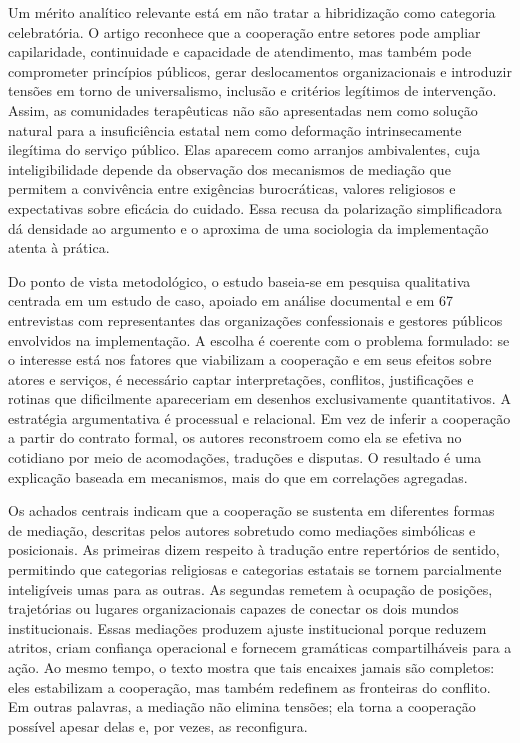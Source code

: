 \documentclass[12pt,a4paper]{article}
\begin{document}
Um mérito analítico relevante está em não tratar a hibridização como categoria celebratória. O artigo reconhece que a cooperação entre setores pode ampliar capilaridade, continuidade e capacidade de atendimento, mas também pode comprometer princípios públicos, gerar deslocamentos organizacionais e introduzir tensões em torno de universalismo, inclusão e critérios legítimos de intervenção. Assim, as comunidades terapêuticas não são apresentadas nem como solução natural para a insuficiência estatal nem como deformação intrinsecamente ilegítima do serviço público. Elas aparecem como arranjos ambivalentes, cuja inteligibilidade depende da observação dos mecanismos de mediação que permitem a convivência entre exigências burocráticas, valores religiosos e expectativas sobre eficácia do cuidado. Essa recusa da polarização simplificadora dá densidade ao argumento e o aproxima de uma sociologia da implementação atenta à prática.\parencite{lotta2023_jesus_speaks}

Do ponto de vista metodológico, o estudo baseia-se em pesquisa qualitativa centrada em um estudo de caso, apoiado em análise documental e em 67 entrevistas com representantes das organizações confessionais e gestores públicos envolvidos na implementação. A escolha é coerente com o problema formulado: se o interesse está nos fatores que viabilizam a cooperação e em seus efeitos sobre atores e serviços, é necessário captar interpretações, conflitos, justificações e rotinas que dificilmente apareceriam em desenhos exclusivamente quantitativos. A estratégia argumentativa é processual e relacional. Em vez de inferir a cooperação a partir do contrato formal, os autores reconstroem como ela se efetiva no cotidiano por meio de acomodações, traduções e disputas. O resultado é uma explicação baseada em mecanismos, mais do que em correlações agregadas.\parencite{lotta2023_jesus_speaks}

Os achados centrais indicam que a cooperação se sustenta em diferentes formas de mediação, descritas pelos autores sobretudo como mediações simbólicas e posicionais. As primeiras dizem respeito à tradução entre repertórios de sentido, permitindo que categorias religiosas e categorias estatais se tornem parcialmente inteligíveis umas para as outras. As segundas remetem à ocupação de posições, trajetórias ou lugares organizacionais capazes de conectar os dois mundos institucionais. Essas mediações produzem ajuste institucional porque reduzem atritos, criam confiança operacional e fornecem gramáticas compartilháveis para a ação. Ao mesmo tempo, o texto mostra que tais encaixes jamais são completos: eles estabilizam a cooperação, mas também redefinem as fronteiras do conflito. Em outras palavras, a mediação não elimina tensões; ela torna a cooperação possível apesar delas e, por vezes, as reconfigura.\parencite{lotta2023_jesus_speaks}
\end{document}
